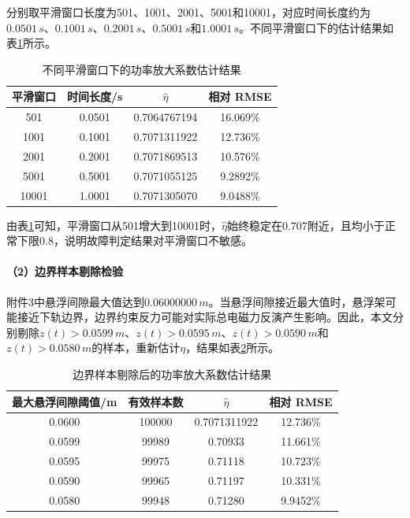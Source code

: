 \documentclass[a4paper]{nmmcm}
\begin{document}
分别取平滑窗口长度为501、1001、2001、5001和10001，对应时间长度约为$0.0501\,s$、$0.1001\,s$、$0.2001\,s$、$0.5001\,s$和$1.0001\,s$。不同平滑窗口下的估计结果如表\ref{tab:problem3_window}所示。

\FloatBarrier
\begin{table}[H]
\centering
\caption{不同平滑窗口下的功率放大系数估计结果}
\label{tab:problem3_window}
\begin{tabular}{c c c c}
\hline
平滑窗口 & 时间长度/s & $\hat{\eta}$ & 相对 RMSE \\
\hline
501 & 0.0501 & 0.7064767194 & 16.069\% \\
1001 & 0.1001 & 0.7071311922 & 12.736\% \\
2001 & 0.2001 & 0.7071869513 & 10.576\% \\
5001 & 0.5001 & 0.7071055125 & 9.2892\% \\
10001 & 1.0001 & 0.7071305070 & 9.0488\% \\
\hline
\end{tabular}
\end{table}
\FloatBarrier

由表\ref{tab:problem3_window}可知，平滑窗口从501增大到10001时，$\hat{\eta}$始终稳定在$0.707$附近，且均小于正常下限$0.8$，说明故障判定结果对平滑窗口不敏感。

\paragraph{（2）边界样本剔除检验}

附件3中悬浮间隙最大值达到$0.06000000\,m$。当悬浮间隙接近最大值时，悬浮架可能接近下轨边界，边界约束反力可能对实际总电磁力反演产生影响。因此，本文分别剔除$z(t)>0.0599\,m$、$z(t)>0.0595\,m$、$z(t)>0.0590\,m$和$z(t)>0.0580\,m$的样本，重新估计$\eta$，结果如表\ref{tab:problem3_boundary}所示。

\FloatBarrier
\begin{table}[H]
\centering
\caption{边界样本剔除后的功率放大系数估计结果}
\label{tab:problem3_boundary}
\begin{tabular}{c c c c}
\hline
最大悬浮间隙阈值/m & 有效样本数 & $\hat{\eta}$ & 相对 RMSE \\
\hline
0.0600 & 100000 & 0.7071311922 & 12.736\% \\
0.0599 & 99989 & 0.70933 & 11.661\% \\
0.0595 & 99975 & 0.71118 & 10.723\% \\
0.0590 & 99965 & 0.71197 & 10.331\% \\
0.0580 & 99948 & 0.71280 & 9.9452\% \\
\hline
\end{tabular}
\end{table}
\FloatBarrier
\end{document}
